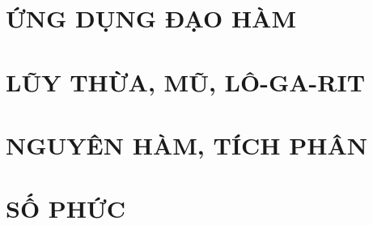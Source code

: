 \documentclass[12pt,a4paper,twoside]{book}
\theoremstyle{nonumberplain}
\begin{document}
\tableofcontents

\chapter{ỨNG DỤNG ĐẠO HÀM}
	\setcounter{section}{0}
	
	\newpage
	\newpage
	\newpage
	\newpage
	\newpage

\chapter{LŨY THỪA, MŨ, LÔ-GA-RIT}
	\setcounter{section}{0}
	
	\newpage
	\newpage
	\newpage
	\newpage
	\newpage
	\newpage

\chapter{NGUYÊN HÀM, TÍCH PHÂN}
	\setcounter{section}{0}
	
	\newpage
	\newpage
	\newpage

\chapter{SỐ PHỨC}
	\setcounter{section}{0}
	
	\newpage
	\newpage
	\newpage
	\newpage
\end{document}

